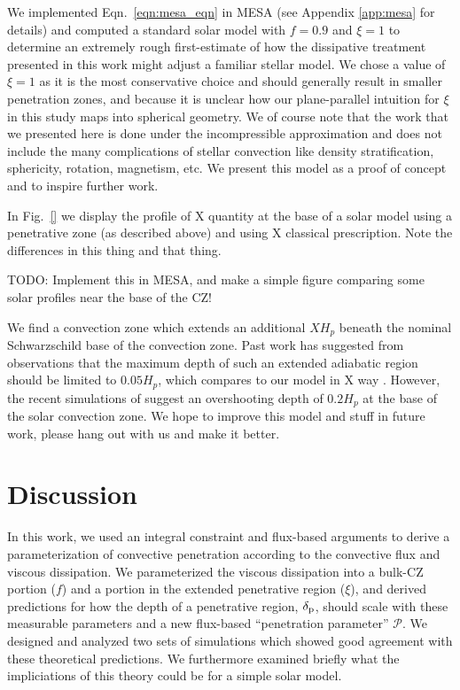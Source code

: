 \documentclass[twocolumn]{aastex631}
\newcommand{\delp}{\ensuremath{\delta_{\rm{p}}}}
\newcommand{\mP}{\ensuremath{\mathcal{P}}}
\begin{document}
We implemented Eqn.~\ref{eqn:mesa_eqn} in MESA (see Appendix \ref{app:mesa} for details) and computed a standard solar model with $f = 0.9$ and $\xi = 1$ to determine an extremely rough first-estimate of how the dissipative treatment presented in this work might adjust a familiar stellar model.
We chose a value of $\xi = 1$ as it is the most conservative choice and should generally result in smaller penetration zones, and because it is unclear how our plane-parallel intuition for $\xi$ in this study maps into spherical geometry.
We of course note that the work that we presented here is done under the incompressible approximation and does not include the many complications of stellar convection like density stratification, sphericity, rotation, magnetism, etc.
We present this model as a proof of concept and to inspire further work.

In Fig.~\ref{} we display the profile of X quantity at the base of a solar model using a penetrative zone (as described above) and using X classical prescription.
Note the differences in this thing and that thing.

TODO: Implement this in MESA, and make a simple figure comparing some solar profiles near the base of the CZ!

We find a convection zone which extends an additional $X H_p$ beneath the nominal Schwarzschild base of the convection zone.
Past work has suggested from observations that the maximum depth of such an extended adiabatic region should be limited to $0.05 H_p$, which compares to our model in X way \citep[see e.g., section 7.2.1 of][]{basu2016}.
However, the recent simulations of \citet{kapyla2019} suggest an overshooting depth of $0.2 H_p$ at the base of the solar convection zone.
We hope to improve this model and stuff in future work, please hang out with us and make it better.


\section{Discussion}
\label{sec:discussion}
In this work, we used an integral constraint \citep[reminiscent of][]{roxburgh1989} and flux-based arguments \citep[similar to][]{zahn1991} to derive a parameterization of convective penetration according to the convective flux and viscous dissipation.
We parameterized the viscous dissipation into a bulk-CZ portion ($f$) and a portion in the extended penetrative region ($\xi$), and derived predictions for how the depth of a penetrative region, $\delp$, should scale with these measurable parameters and a new flux-based ``penetration parameter'' $\mP$.
We designed and analyzed two sets of simulations which showed good agreement with these theoretical predictions.
We furthermore examined briefly what the impliciations of this theory could be for a simple solar model.
\end{document}
